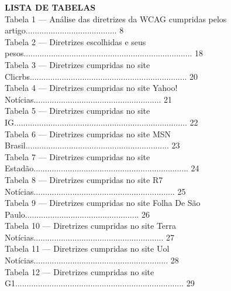 \documentclass[a4paper]{article}
\begin{document}
\begin{titlepage}
	\begin{center}
		{\large \textbf{LISTA DE TABELAS}}\\[1cm]
		Tabela 1 — Análise das diretrizes da WCAG cumpridas pelos artigo........................................ 8\\[0.5cm]
		Tabela 2 — Diretrizes escolhidas e seus pesos.......................................................................... 18\\[0.5cm]
		Tabela 3 — Diretrizes cumpridas no site Clicrbs..................................................................... 20\\[0.5cm]
		Tabela 4 — Diretrizes cumpridas no site Yahoo! Notícias........................................................ 21\\[0.5cm]
		Tabela 5 — Diretrizes cumpridas no site IG............................................................................ 22\\[0.5cm]
		Tabela 6 — Diretrizes cumpridas no site MSN Brasil............................................................... 23\\[0.5cm]
		Tabela 7 — Diretrizes cumpridas no site Estadão.................................................................... 24\\[0.5cm]
		Tabela 8 — Diretrizes cumpridas no site R7 Notícias.............................................................. 25\\[0.5cm]
		Tabela 9 — Diretrizes cumpridas no site Folha De São Paulo.................................................. 26\\[0.5cm]
		Tabela 10 — Diretrizes cumpridas no site Terra Notícias......................................................... 27\\[0.5cm]
		Tabela 11 — Diretrizes cumpridas no site Uol Notícias........................................................... 28\\[0.5cm]
		Tabela 12 — Diretrizes cumpridas no site G1.......................................................................... 29\\[0.5cm]
	\end{center}
\end{titlepage}
\end{document}
